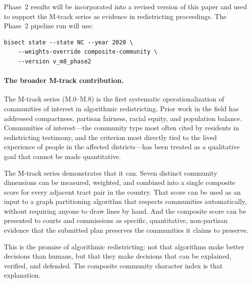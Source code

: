 Phase~2 results will be incorporated into a revised version of this paper
and used to support the M-track series as evidence in redistricting proceedings.
The Phase~2 pipeline run will use:
\begin{verbatim}
bisect state --state NC --year 2020 \
    --weights-override composite-community \
    --version v_m8_phase2
\end{verbatim}

\paragraph{The broader M-track contribution.}
The M-track series (M.0--M.8) is the first systematic operationalization of
communities of interest in algorithmic redistricting.
Prior work in the field has addressed compactness, partisan fairness, racial
equity, and population balance.
Communities of interest---the community type most often cited by residents
in redistricting testimony, and the criterion most directly tied to the
lived experience of people in the affected districts---has been treated as
a qualitative goal that cannot be made quantitative.

The M-track series demonstrates that it can.
Seven distinct community dimensions can be measured, weighted, and combined
into a single composite score for every adjacent tract pair in the country.
That score can be used as an input to a graph partitioning algorithm that
respects communities automatically, without requiring anyone to draw lines
by hand.
And the composite score can be presented to courts and commissions as
specific, quantitative, non-partisan evidence that the submitted plan
preserves the communities it claims to preserve.

This is the promise of algorithmic redistricting: not that algorithms make
better decisions than humans, but that they make decisions that can be
explained, verified, and defended.
The composite community character index is that explanation.
